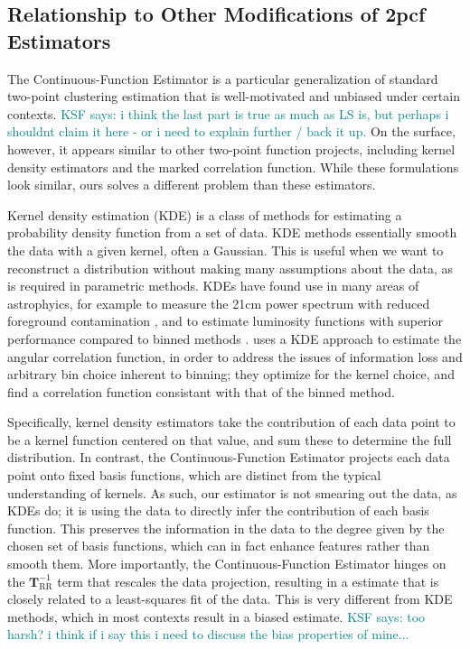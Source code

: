 \documentclass[modern]{aastex62}
\newcommand{\cf}{2pcf\xspace} %
\newcommand{\Est}{The Continuous-Function Estimator\xspace}
\newcommand{\est}{the Continuous-Function Estimator\xspace}
\newcommand{\inv}{^{-1}}
\newcommand{\bld}[1]{\bm{#1}} %
\newcommand{\TT}[1]{\bld{T}_\mathrm{#1}}
\newcommand{\KSF}[1]{\textcolor{teal}{KSF says: #1}}
\begin{document}
\subsection{Relationship to Other Modifications of \cf Estimators}
\label{sec:otherest}

\Est is a particular generalization of standard two-point clustering estimation that is well-motivated and unbiased under certain contexts. \KSF{i think the last part is true as much as LS is, but perhaps i shouldnt claim it here - or i need to explain further / back it up.}
On the surface, however, it appears similar to other two-point function projects, including kernel density estimators and the marked correlation function.
While these formulations look similar, ours solves a different problem than these estimators.

Kernel density estimation (KDE) is a class of methods for estimating a probability density function from a set of data.
KDE methods essentially smooth the data with a given kernel, often a Gaussian.
This is useful when we want to reconstruct a distribution without making many assumptions about the data, as is required in parametric methods.
KDEs have found use in many areas of astrophyics, for example to measure the 21cm power spectrum with reduced foreground contamination \citep{Trott2019}, and to estimate luminosity functions with superior performance compared to binned methods \citep{Yuan2020}.
\cite{Hatfield2016} uses a KDE approach to estimate the angular correlation function, in order to address the issues of information loss and arbitrary bin choice inherent to binning; they optimize for the kernel choice, and find a correlation function consistant with that of the binned method.

Specifically, kernel density estimators take the contribution of each data point to be a kernel function centered on that value, and sum these to determine the full distribution.
In contrast, \est projects each data point onto fixed basis functions, which are distinct from the typical understanding of kernels.
As such, our estimator is not smearing out the data, as KDEs do; it is using the data to directly infer the contribution of each basis function.
This preserves the information in the data to the degree given by the chosen set of basis functions, which can in fact enhance features rather than smooth them.
More importantly, \est hinges on the $\TT{RR}\inv$ term that rescales the data projection, resulting in a estimate that is closely related to a least-squares fit of the data.
This is very different from KDE methods, which in most contexts result in a biased estimate. \KSF{too harsh? i think if i say this i need to discuss the bias properties of mine...}
\end{document}
